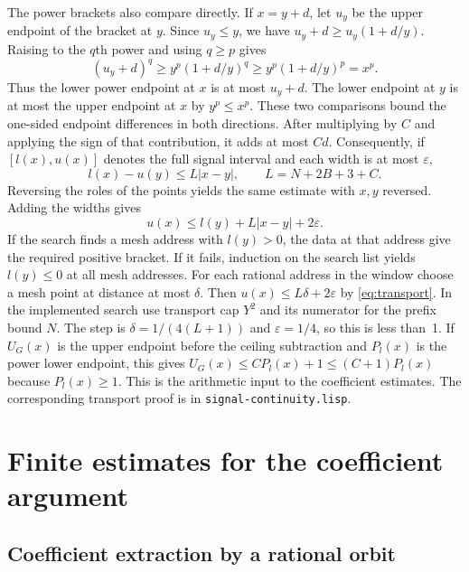 \documentclass[11pt]{amsart}
\theoremstyle{definition}
\theoremstyle{remark}
\numberwithin{equation}{section}
\newcommand{\code}[1]{\nolinkurl{#1}}
\begin{document}
The power brackets also compare directly. If $x=y+d$, let $u_y$
be the upper endpoint of the bracket at $y$. Since $u_y\le y$,
we have $u_y+d\ge u_y(1+d/y)$. Raising to the $q$th power
and using $q\ge p$ gives
\[
 (u_y+d)^q\ge y^p(1+d/y)^q\ge y^p(1+d/y)^p=x^p .
\]
Thus the lower power endpoint at $x$ is at most $u_y+d$.
The lower endpoint at $y$ is at most the upper endpoint at $x$
by $y^p\le x^p$. These two comparisons bound the one-sided endpoint
differences in both directions. After multiplying by $C$ and
applying the sign of that contribution, it adds at most $Cd$.
Consequently, if $[l(x),u(x)]$ denotes the full signal interval
and each width is at most $\varepsilon$,
\[
     l(x)-u(y)\le L|x-y|,\qquad L=N+2B+3+C.
\]
Reversing the roles of the points yields the same estimate
with $x,y$ reversed. Adding the widths gives
\begin{equation}\label{eq:transport}
 u(x)\le l(y)+L|x-y|+2\varepsilon .
\end{equation}
If the search finds a mesh address with $l(y)>0$, the data at that
address give the required positive bracket. If it fails, induction on
the search list yields $l(y)\le0$ at all mesh addresses. For each
rational address in the window choose a mesh point at distance at most
$\delta$. Then $u(x)\le L\delta+2\varepsilon$ by
\eqref{eq:transport}. In the implemented search use transport cap
$Y^2$ and its numerator for the prefix bound $N$.
The step is
$\delta=1/(4(L+1))$ and $\varepsilon=1/4$, so this is less than~1.
If $U_G(x)$ is the upper endpoint before the ceiling subtraction
and $P_l(x)$ is the power lower endpoint, this gives
$U_G(x)\le CP_l(x)+1\le(C+1)P_l(x)$ because $P_l(x)\ge1$.
This is the arithmetic input to the coefficient estimates. The
corresponding transport proof is in \code{signal-continuity.lisp}.

\section{Finite estimates for the coefficient argument}

\subsection{Coefficient extraction by a rational orbit}
\end{document}
